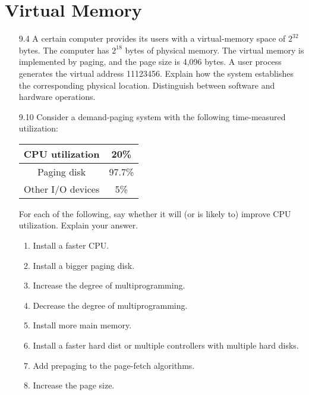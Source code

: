 \chapter{Virtual Memory}

\begin{enumerate}
    \item [9.4] A certain computer provides its users with a virtual-memory space of $2^{32}$ bytes. The computer has $2^{18}$ bytes of physical memory. The virtual memory is implemented by paging, and the page size is 4,096 bytes. A user process generates the virtual address 11123456. Explain how the system establishes the corresponding physical location. Distinguish between software and hardware operations.
    
    
    
    \item [9.10] Consider a demand-paging system with the following time-measured utilization:
    
    \begin{center}
        \begin{tabular}{|c|c|}
            \hline
            CPU utilization & 20\% \\
            \hline
            Paging disk & 97.7\% \\
            \hline
            Other I/O devices & 5\% \\
            \hline
        \end{tabular}
    \end{center}
    
    For each of the following, say whether it will (or is likely to) improve CPU utilization. Explain your answer.
    
    \begin{enumerate}
        \item Install a faster CPU.
        \item Install a bigger paging disk.
        \item Increase the degree of multiprogramming.
        \item Decrease the degree of multiprogramming.
        \item Install more main memory.
        \item Install a faster hard dist or multiple controllers with multiple hard disks.
        \item Add prepaging to the page-fetch algorithms.
        \item Increase the page size.
    \end{enumerate}
    

\end{enumerate}
